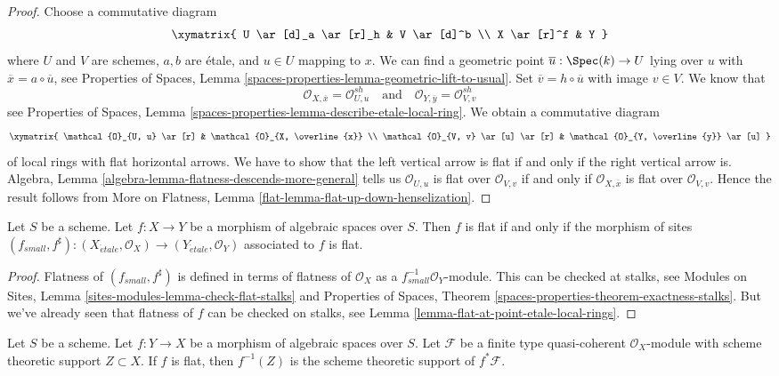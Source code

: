 \begin{proof}
Choose a commutative diagram
$$
\xymatrix{
U \ar[d]_a \ar[r]_h & V \ar[d]^b \\
X \ar[r]^f & Y
}
$$
where $U$ and $V$ are schemes, $a, b$ are \'etale, and
$u \in U$ mapping to $x$. We can find a geometric point
$\overline{u} : \Spec(k) \to U$ lying over $u$ with
$\overline{x} = a \circ \overline{u}$, see
Properties of Spaces, Lemma
\ref{spaces-properties-lemma-geometric-lift-to-usual}.
Set $\overline{v} = h \circ \overline{u}$ with image $v \in V$.
We know that
$$
\mathcal{O}_{X, \overline{x}} = \mathcal{O}_{U, u}^{sh}
\quad\text{and}\quad
\mathcal{O}_{Y, \overline{y}} = \mathcal{O}_{V, v}^{sh}
$$
see
Properties of Spaces, Lemma
\ref{spaces-properties-lemma-describe-etale-local-ring}.
We obtain a commutative diagram
$$
\xymatrix{
\mathcal{O}_{U, u} \ar[r] &
\mathcal{O}_{X, \overline{x}} \\
\mathcal{O}_{V, v} \ar[u] \ar[r] &
\mathcal{O}_{Y, \overline{y}} \ar[u]
}
$$
of local rings with flat horizontal arrows. We have to show that the
left vertical arrow is flat if and only if the right vertical arrow is.
Algebra, Lemma \ref{algebra-lemma-flatness-descends-more-general}
tells us $\mathcal{O}_{U, u}$ is flat over $\mathcal{O}_{V, v}$
if and only if $\mathcal{O}_{X, \overline{x}}$ is flat over
$\mathcal{O}_{V, v}$. Hence the result follows from
More on Flatness, Lemma \ref{flat-lemma-flat-up-down-henselization}.
\end{proof}

\begin{lemma}
\label{lemma-flat-morphism-sites}
Let $S$ be a scheme.
Let $f : X \to Y$ be a morphism of algebraic spaces over $S$.
Then $f$ is flat if and only if the morphism of sites
$
(f_{small}, f^\sharp) :
(X_{\acute{e}tale}, \mathcal{O}_X)
\to
(Y_{\acute{e}tale}, \mathcal{O}_Y)
$
associated to $f$ is flat.
\end{lemma}

\begin{proof}
Flatness of $(f_{small}, f^\sharp)$ is defined in terms of
flatness of $\mathcal{O}_X$ as a $f_{small}^{-1}\mathcal{O}_Y$-module.
This can be checked at stalks, see
Modules on Sites, Lemma \ref{sites-modules-lemma-check-flat-stalks}
and
Properties of Spaces, Theorem \ref{spaces-properties-theorem-exactness-stalks}.
But we've already seen that flatness of $f$ can be checked on stalks, see
Lemma \ref{lemma-flat-at-point-etale-local-rings}.
\end{proof}

\begin{lemma}
\label{lemma-flat-pullback-support}
Let $S$ be a scheme. Let $f : Y \to X$ be a morphism of algebraic spaces
over $S$. Let $\mathcal{F}$ be a finite type quasi-coherent
$\mathcal{O}_X$-module with scheme theoretic support $Z \subset X$.
If $f$ is flat, then $f^{-1}(Z)$ is the scheme theoretic support of
$f^*\mathcal{F}$.
\end{lemma}

